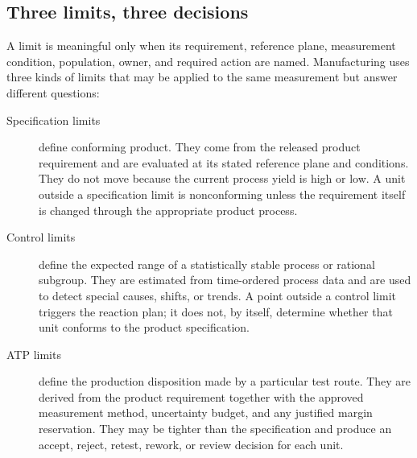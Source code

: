 \subsection{Three limits, three decisions}

A limit is meaningful only when its requirement, reference plane, measurement
condition, population, owner, and required action are named. Manufacturing uses
three kinds of limits that may be applied to the same measurement but answer
different questions:

\begin{description}
\item[Specification limits] define conforming product. They come from the
      released product requirement and are evaluated at its stated reference
      plane and conditions. They do not move because the current process yield
      is high or low. A unit outside a specification limit is nonconforming
      unless the requirement itself is changed through the appropriate product
      process.
\item[Control limits] define the expected range of a statistically stable
      process or rational subgroup. They are estimated from time-ordered process
      data and are used to detect special causes, shifts, or trends. A point
      outside a control limit triggers the reaction plan; it does not, by
      itself, determine whether that unit conforms to the product
      specification.
\item[ATP limits] define the production disposition made by a particular test
      route. They are derived from the product requirement together with the
      approved measurement method, uncertainty budget, and any justified margin
      reservation. They may be tighter than the specification and produce an
      accept, reject, retest, rework, or review decision for each unit.
\end{description}

